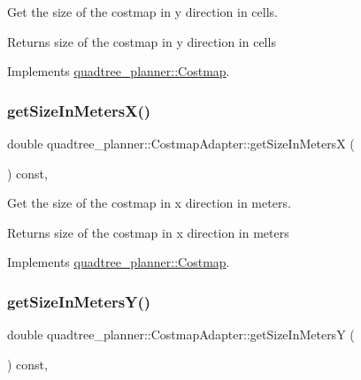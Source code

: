 Get the size of the costmap in y direction in cells. 

\begin{DoxyReturn}{Returns}
size of the costmap in y direction in cells 
\end{DoxyReturn}


Implements \hyperlink{classquadtree__planner_1_1Costmap_a5c07589004856b158dbbe38470562bfe}{quadtree\+\_\+planner\+::\+Costmap}.

\mbox{\label{classquadtree__planner_1_1CostmapAdapter_a360c5f4047437c2fb69b91e598e0aecf}} 
\subsubsection{\texorpdfstring{get\+Size\+In\+Meters\+X()}{getSizeInMetersX()}}
{\footnotesize\ttfamily double quadtree\+\_\+planner\+::\+Costmap\+Adapter\+::get\+Size\+In\+MetersX (\begin{DoxyParamCaption}{ }\end{DoxyParamCaption}) const\hspace{0.3cm}{\ttfamily [override]}, {\ttfamily [virtual]}}



Get the size of the costmap in x direction in meters. 

\begin{DoxyReturn}{Returns}
size of the costmap in x direction in meters 
\end{DoxyReturn}


Implements \hyperlink{classquadtree__planner_1_1Costmap_a86720bf9d3de86f59af0229d706763c1}{quadtree\+\_\+planner\+::\+Costmap}.

\mbox{\label{classquadtree__planner_1_1CostmapAdapter_aa253651d1b4596009ca26009e7ad28f8}} 
\subsubsection{\texorpdfstring{get\+Size\+In\+Meters\+Y()}{getSizeInMetersY()}}
{\footnotesize\ttfamily double quadtree\+\_\+planner\+::\+Costmap\+Adapter\+::get\+Size\+In\+MetersY (\begin{DoxyParamCaption}{ }\end{DoxyParamCaption}) const\hspace{0.3cm}{\ttfamily [override]}, {\ttfamily [virtual]}}



